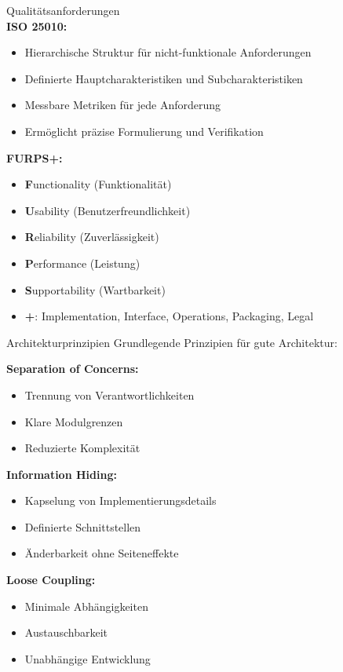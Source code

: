 \begin{theorem}{Qualitätsanforderungen}\\
\textbf{ISO 25010:}
\begin{itemize}
    \item Hierarchische Struktur für nicht-funktionale Anforderungen
    \item Definierte Hauptcharakteristiken und Subcharakteristiken
    \item Messbare Metriken für jede Anforderung
    \item Ermöglicht präzise Formulierung und Verifikation
\end{itemize}

\textbf{FURPS+:}
\begin{itemize}
    \item \textbf{F}unctionality (Funktionalität)
    \item \textbf{U}sability (Benutzerfreundlichkeit)
    \item \textbf{R}eliability (Zuverlässigkeit)
    \item \textbf{P}erformance (Leistung)
    \item \textbf{S}upportability (Wartbarkeit)
    \item \textbf{+}: Implementation, Interface, Operations, Packaging, Legal
\end{itemize}
\end{theorem}

\begin{concept}{Architekturprinzipien}
Grundlegende Prinzipien für gute Architektur:

\textbf{Separation of Concerns:}
\begin{itemize}
    \item Trennung von Verantwortlichkeiten
    \item Klare Modulgrenzen
    \item Reduzierte Komplexität
\end{itemize}

\textbf{Information Hiding:}
\begin{itemize}
    \item Kapselung von Implementierungsdetails
    \item Definierte Schnittstellen
    \item Änderbarkeit ohne Seiteneffekte
\end{itemize}

\textbf{Loose Coupling:}
\begin{itemize}
    \item Minimale Abhängigkeiten
    \item Austauschbarkeit
    \item Unabhängige Entwicklung
\end{itemize}
\end{concept}


